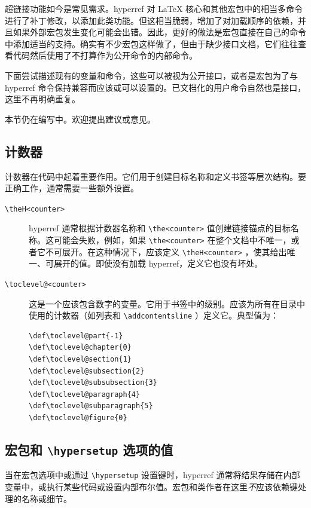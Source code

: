 \documentclass{article}
\newcommand*{\cs}[1]{%
  \texttt{\textbackslash #1}%
}
\newcommand*{\xpackage}[1]{\textsf{#1}}
\begin{document}
超链接功能如今是常见需求。\xpackage{hyperref} 对 \LaTeX{} 核心和其他宏包中的相当多命令进行了补丁修改，以添加此类功能。但这相当脆弱，增加了对加载顺序的依赖，并且如果外部宏包发生变化可能会出错。因此，更好的做法是宏包直接在自己的命令中添加适当的支持。确实有不少宏包这样做了，但由于缺少接口文档，它们往往查看代码然后使用了不打算作为公开命令的内部命令。

下面尝试描述现有的变量和命令，这些可以被视为公开接口，或者是宏包为了与 \xpackage{hyperref} 命令保持兼容而应该或可以设置的。已文档化的用户命令自然也是接口，这里不再明确重复。

本节仍在编写中。欢迎提出建议或意见。


\subsection{计数器}

计数器在代码中起着重要作用。它们用于创建目标名称和定义书签等层次结构。要正确工作，通常需要一些额外设置。

\begin{description}

\item[\cs{theH<counter>}]  \xpackage{hyperref} 通常根据计数器名称和 \cs{the<counter>} 值创建链接锚点的目标名称。这可能会失败，例如，如果 \cs{the<counter>} 在整个文档中不唯一，或者它不可展开。在这种情况下，应该定义 \cs{theH<counter>}，使其给出唯一、可展开的值。即使没有加载 \xpackage{hyperref}，定义它也没有坏处。

\item[\cs{toclevel@<counter>}] 这是一个应该包含数字的变量。它用于书签中的级别。应该为所有在目录中使用的计数器（如列表和 \cs{addcontentsline}）定义它。典型值为：

\begin{verbatim}
\def\toclevel@part{-1}
\def\toclevel@chapter{0}
\def\toclevel@section{1}
\def\toclevel@subsection{2}
\def\toclevel@subsubsection{3}
\def\toclevel@paragraph{4}
\def\toclevel@subparagraph{5}
\def\toclevel@figure{0}
\end{verbatim}

\end{description}

\subsection{宏包和 \texorpdfstring{\texttt{\textbackslash hypersetup}}{hypersetup} 选项的值}

当在宏包选项中或通过 \cs{hypersetup} 设置键时，\xpackage{hyperref} 通常将结果存储在内部变量中，或执行某些代码或设置内部布尔值。宏包和类作者在这里\emph{不}应该依赖键处理的名称或细节。
\end{document}
